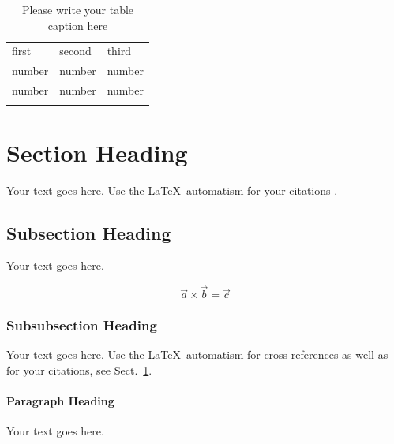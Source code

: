 \begin{multicols}{2}
    \begin{theorem}
        \begin{table}
        \centering
        \caption{Please write your table caption here}
        \label{tab:1}       %
        \begin{tabular}{lll}
        \hline\noalign{\smallskip}
        first & second & third  \\
        \noalign{\smallskip}\hline\noalign{\smallskip}
        number & number & number \\
        number & number & number \\
        \noalign{\smallskip}\hline
        \end{tabular}
        \end{table}

    \end{theorem}


%
\section{Section Heading}
\label{sec:1}
Your text goes here. Use the \LaTeX\ automatism for your citations
\cite{monograph}.

\subsection{Subsection Heading}
\label{sec:2}
Your text goes here.

\begin{equation}
\vec{a}\times\vec{b}=\vec{c}
\end{equation}

\subsubsection{Subsubsection Heading}
Your text goes here. Use the \LaTeX\ automatism for cross-references as
well as for your citations, see Sect.~\ref{sec:1}.

\paragraph{Paragraph Heading} %
Your text goes here.


\end{multicols}
